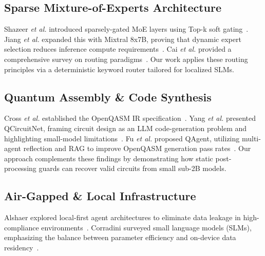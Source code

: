 \documentclass[journal]{IEEEtran}
\begin{document}
\subsection{Sparse Mixture-of-Experts Architecture}
Shazeer \emph{et al.} introduced sparsely-gated MoE layers using Top-k soft
gating~\cite{shazeer}. Jiang \emph{et al.} expanded this with Mixtral 8x7B,
proving that dynamic expert selection reduces inference compute
requirements~\cite{mixtral}. Cai \emph{et al.} provided a comprehensive survey
on routing paradigms~\cite{cai2024survey}. Our work applies these routing
principles via a deterministic keyword router tailored for localized SLMs.

\subsection{Quantum Assembly \& Code Synthesis}
Cross \emph{et al.} established the OpenQASM IR specification~\cite{cross2017}.
Yang \emph{et al.} presented QCircuitNet, framing circuit design as an LLM
code-generation problem and highlighting small-model
limitations~\cite{yang2024qcircuitnet}. Fu \emph{et al.} proposed QAgent,
utilizing multi-agent reflection and RAG to improve OpenQASM generation pass
rates~\cite{fu2025qagent}. Our approach complements these findings by
demonstrating how static post-processing guards can recover valid circuits from
small sub-2B models.

\subsection{Air-Gapped \& Local Infrastructure}
Alshaer explored local-first agent architectures to eliminate data leakage in
high-compliance environments~\cite{alshaer2024}. Corradini surveyed small
language models (SLMs), emphasizing the balance between parameter efficiency and
on-device data residency~\cite{corradini2025}.
\end{document}
